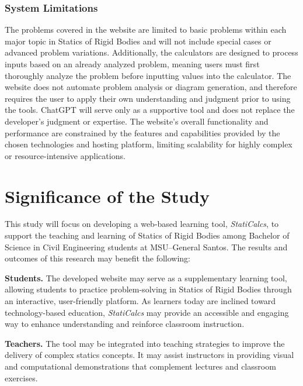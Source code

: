 \subsubsection*{System Limitations}

The problems covered in the website are limited to basic problems 
within each major topic in Statics of Rigid Bodies and will not 
include special cases or advanced problem variations. Additionally, 
the calculators are designed to process inputs based on an already 
analyzed problem, meaning users must first thoroughly analyze the 
problem before inputting values into the calculator. The website does 
not automate problem analysis or diagram generation, and therefore 
requires the user to apply their own understanding and judgment prior 
to using the tools. ChatGPT will serve only as a supportive tool and 
does not replace the developer's judgment or expertise. The website's 
overall functionality and performance are constrained by the features 
and capabilities provided by the chosen technologies and hosting 
platform, limiting scalability for highly complex or resource-intensive 
applications.




\section{Significance of the Study}\label{sec:1-sots}


This study will focus on developing a web-based learning tool, \textit{StatiCalcs}, to support the teaching and learning of Statics of Rigid Bodies among Bachelor of Science in Civil Engineering students at MSU--General Santos. The results and outcomes of this research may benefit the following:

\medskip
\textbf{Students.} The developed website may serve as a supplementary learning tool, allowing students to practice problem-solving in Statics of Rigid Bodies through an interactive, user-friendly platform. As learners today are inclined toward technology-based education, \textit{StatiCalcs} may provide an accessible and engaging way to enhance understanding and reinforce classroom instruction.

\medskip
\textbf{Teachers.} The tool may be integrated into teaching strategies to improve the delivery of complex statics concepts. It may assist instructors in providing visual and computational demonstrations that complement lectures and classroom exercises.

